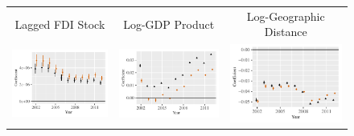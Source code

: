 \documentclass[reqno,onecolumn,letterpaper,12pt]{article}
\begin{document}
\begin{figure}[htp]
\centering
\begin{tabular}{@{\hskip -.05cm}c@{\hskip -.2cm}c@{\hskip -.2cm}c}

Lagged FDI Stock&
Log-GDP Product &
Log-Geographic Distance\\

\includegraphics[height=.165\textheight, clip=true, trim=.5cm .5cm 0cm .1cm]{figures/main_rl_plots/LDV.pdf} &
\includegraphics[height=.165\textheight, clip=true, trim=.5cm .5cm 0cm .1cm]{figures/main_rl_plots/Mass.pdf}    &
\includegraphics[height=.165\textheight, clip=true, trim=.5cm .5cm 0cm .1cm]{figures/main_rl_plots/Distance.pdf}  \\



\end{tabular}
\end{figure}
\end{document}
